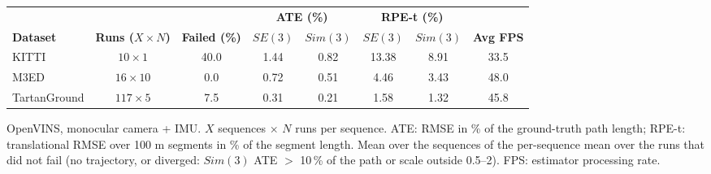 \begin{table}[t]
  \centering
  \small
  \setlength{\tabcolsep}{4pt}
  \begin{tabular}{lccccccc}
    \toprule
     & & & \multicolumn{2}{c}{\textbf{ATE (\%)}} & \multicolumn{2}{c}{\textbf{RPE-t (\%)}} & \\
    \cmidrule(lr){4-5}\cmidrule(lr){6-7}
    \textbf{Dataset} & \textbf{Runs ($X{\times}N$)} & \textbf{Failed (\%)} & $SE(3)$ & $Sim(3)$ & $SE(3)$ & $Sim(3)$ & \textbf{Avg FPS} \\
    \midrule
    KITTI & $10{\times}1$ & 40.0 & 1.44 & 0.82 & 13.38 & 8.91 & 33.5 \\
    M3ED & $16{\times}10$ & 0.0 & 0.72 & 0.51 & 4.46 & 3.43 & 48.0 \\
    TartanGround & $117{\times}5$ & 7.5 & 0.31 & 0.21 & 1.58 & 1.32 & 45.8 \\
    \bottomrule
  \end{tabular}\par
  \vspace{0.4cm}
  {\footnotesize\color{gray} OpenVINS, monocular camera + IMU. $X$ sequences $\times$ $N$ runs per sequence.
  ATE: RMSE in \% of the ground-truth path length; RPE-t: translational RMSE over 100 m
  segments in \% of the segment length. Mean over the sequences of the per-sequence mean over the runs
  that did not fail (no trajectory, or diverged: $Sim(3)$ ATE $>$ 10\,\% of the path
  or scale outside 0.5--2). FPS: estimator processing rate.}
\end{table}
